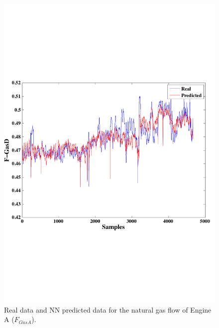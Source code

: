 \begin{figure}
\centering
\includegraphics[width=1\textwidth]{ANNengineD.pdf}
\caption{Real data and NN predicted data for the natural gas flow  of Engine A ($F_{GasA}$).}
\label{FengineA}
\end{figure}

